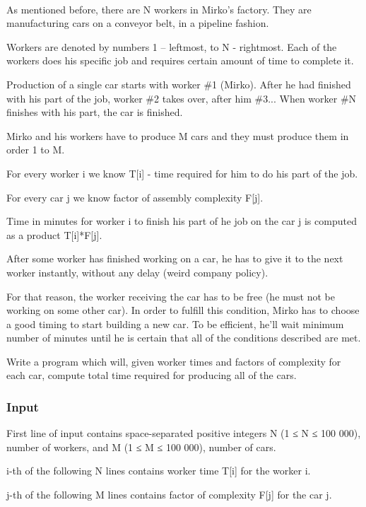 

 

As mentioned before, there are N workers in Mirko's factory. They are manufacturing cars on a conveyor belt, in a pipeline fashion.

Workers are denoted by numbers 1 – leftmost, to N - rightmost. Each of the workers does his specific job and requires certain amount of time to complete it.

Production of a single car starts with worker \#1 (Mirko). After he had finished with his part of the job, worker \#2 takes over, after him \#3... When worker \#N finishes with his part, the car is finished.

Mirko and his workers have to produce M cars and they must produce them in order 1 to M.




For every worker i we know T[i] - time required for him to do his part of the job.

For every car j we know factor of assembly complexity F[j].

Time in minutes for worker i to finish his part of he job on the car j is computed as a product T[i]*F[j].




After some worker has finished working on a car, he has to give it to the next worker instantly, without any delay (weird company policy).

For that reason, the worker receiving the car has to be free (he must not be working on some other car). In order to fulfill this condition, Mirko has to choose a good timing to start building a new car. To be efficient, he’ll wait minimum number of minutes until he is certain that all of the conditions described are met.

Write a program which will, given worker times and factors of complexity for each car, compute total time required for producing all of the cars.

\subsubsection{Input}

First line of input contains space-separated positive integers N (1 ≤ N ≤ 100 000), number of workers, and M (1 ≤ M ≤ 100 000), number of cars.

i-th of the following N lines contains worker time T[i] for the worker i.

j-th of the following M lines contains factor of complexity F[j] for the car j.

